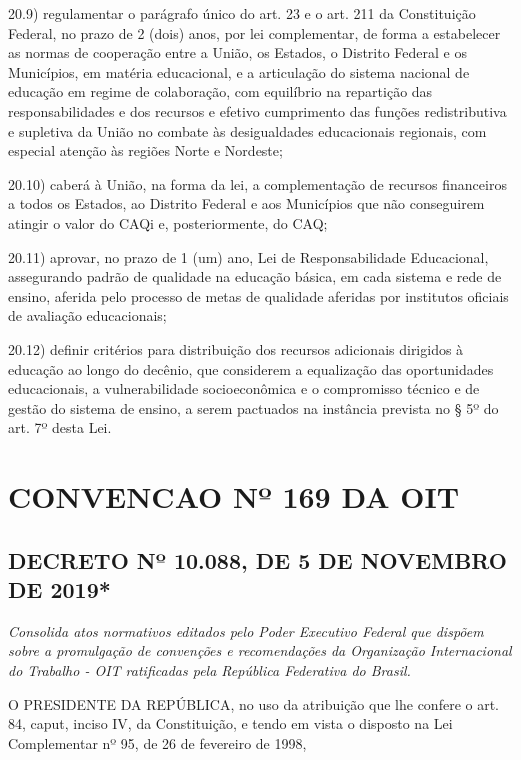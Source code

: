 \documentclass[
]{book}
\begin{document}
20.9) regulamentar o parágrafo único do art. 23 e o art. 211 da Constituição Federal, no prazo de 2 (dois) anos, por lei complementar, de forma a estabelecer as normas de cooperação entre a União, os Estados, o Distrito Federal e os Municípios, em matéria educacional, e a articulação do sistema nacional de educação em regime de colaboração, com equilíbrio na repartição das responsabilidades e dos recursos e efetivo cumprimento das funções redistributiva e supletiva da União no combate às desigualdades educacionais regionais, com especial atenção às regiões Norte e Nordeste;

20.10) caberá à União, na forma da lei, a complementação de recursos financeiros a todos os Estados, ao Distrito Federal e aos Municípios que não conseguirem atingir o valor do CAQi e, posteriormente, do CAQ;

20.11) aprovar, no prazo de 1 (um) ano, Lei de Responsabilidade Educacional, assegurando padrão de qualidade na educação básica, em cada sistema e rede de ensino, aferida pelo processo de metas de qualidade aferidas por institutos oficiais de avaliação educacionais;

20.12) definir critérios para distribuição dos recursos adicionais dirigidos à educação ao longo do decênio, que considerem a equalização das oportunidades educacionais, a vulnerabilidade socioeconômica e o compromisso técnico e de gestão do sistema de ensino, a serem pactuados na instância prevista no § 5º do art. 7º desta Lei.

\hypertarget{convencao-nuxba-169-da-oit}{%
\chapter{CONVENCAO Nº 169 DA OIT}\label{convencao-nuxba-169-da-oit}}

\hypertarget{decreto-nuxba-10.088-de-5-de-novembro-de-2019}{%
\section{DECRETO Nº 10.088, DE 5 DE NOVEMBRO DE 2019*}\label{decreto-nuxba-10.088-de-5-de-novembro-de-2019}}

\emph{Consolida atos normativos editados pelo Poder Executivo Federal que dispõem sobre a promulgação de convenções e recomendações da Organização Internacional do Trabalho - OIT ratificadas pela República Federativa do Brasil.}

O PRESIDENTE DA REPÚBLICA, no uso da atribuição que lhe confere o art. 84, caput, inciso IV, da Constituição, e tendo em vista o disposto na Lei Complementar nº 95, de 26 de fevereiro de 1998,
\end{document}
